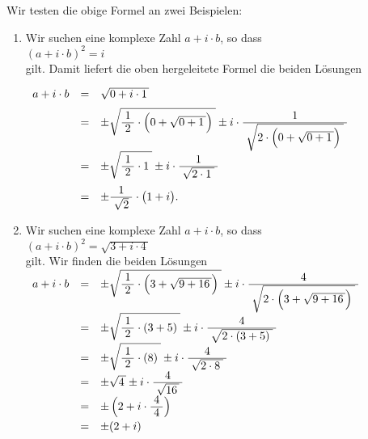 \examples
Wir testen die obige Formel  an zwei Beispielen:
\begin{enumerate}
\item Wir suchen eine komplexe Zahl $a + i \cdot b$, so dass 
      \\[0.2cm]
      \hspace*{1.3cm}
      $(a + i \cdot b)^2 = i$
      \\[0.2cm]
      gilt.  Damit liefert die oben hergeleitete Formel die beiden L\"osungen

     $
       \begin{array}[t]{lcl}
       a + i \cdot b & = & \sqrt{0 + i \cdot 1\,} \\[0.2cm]
                     & = & \pm\sqrt{\bruch{1}{2} \cdot \Bigl(0 + \sqrt{0 + 1\,}\Bigr)\;} \pm
                           i \cdot \bruch{1}{\sqrt{2\cdot \Bigl(0 + \sqrt{0 + 1\,}\Bigr)\;}}    \\[0.2cm]
                     & = & \pm\sqrt{\bruch{1}{2} \cdot 1\;} \pm i \cdot \bruch{1}{\sqrt{2\cdot 1\;}} \\[0.4cm]
                     & = & \pm\bruch{1}{\sqrt{2}} \cdot \bigl(1 + i\bigr).
       \end{array}
       $
\item Wir suchen eine komplexe Zahl $a + i \cdot b$, so dass
       \\[0.2cm]
       \hspace*{1.3cm}
       $(a + i \cdot b)^2 = \sqrt{3 + i \cdot 4\,}$
       \\[0.2cm]
       gilt. Wir finden die beiden L\"osungen
       \\[0.2cm]
       \hspace*{1.3cm}
       $
       \begin{array}[t]{lcl}
             a + i \cdot b 
       & = & \pm \sqrt{\bruch{1}{2} \cdot \Bigl(3 + \sqrt{9 + 16\,}\Bigr)\;} \pm
             i \cdot \bruch{4}{\sqrt{2\cdot \Bigl(3 + \sqrt{9 + 16\,}\Bigr)\;}}    \\[0.2cm]
       & = & \pm\sqrt{\bruch{1}{2} \cdot (3 + 5)\;} \pm i \cdot \bruch{4}{\sqrt{2\cdot (3 + 5)\;}}     \\[0.2cm]
       & = & \pm\sqrt{\bruch{1}{2} \cdot (8)\;} \pm i \cdot \bruch{4}{\sqrt{2\cdot 8\;}}     \\[0.2cm]
       & = & \pm\sqrt{4\,} \pm i \cdot \bruch{4}{\sqrt{16\,}}     \\[0.2cm]
       & = & \pm \left(2 + i \cdot \bruch{4}{4}\right)     \\[0.2cm]
       & = & \pm(2 + i)
       \end{array}
       $
\end{enumerate}

